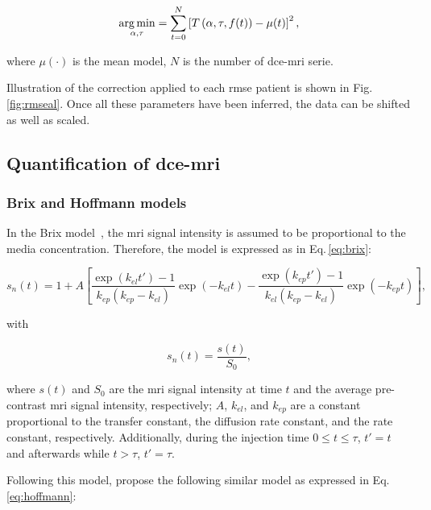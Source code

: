 \begin{equation}
  \operatorname*{arg\,min}_{\alpha, \tau} = \sum_{t=0}^{N} \left[ T\left(\alpha, \tau, f(t)\right) - \mu(t) \right]^{2} ,
  \label{eq:cost}
\end{equation}

\noindent where $\mu(\cdot)$ is the mean model, $N$ is the number of \ac{dce}-\ac{mri} serie.

Illustration of the correction applied to each \ac{rmse} patient is shown in Fig.\,\ref{fig:rmseal}.
Once all these parameters have been inferred, the data can be shifted as well as scaled.

\subsection{Quantification of \ac{dce}-\ac{mri}}\label{sec:stateart}

\subsubsection{Brix and Hoffmann models}\label{sec:brixhoffmann}

In the Brix model~\citep{brix1991pharmacokinetic}, the \ac{mri} signal intensity is assumed to be proportional to the media concentration.
Therefore, the model is expressed as in Eq.\,\eqref{eq:brix}:

\begin{equation}
  s_n(t) = 1 + A \left[ \frac{\exp(k_{el} t') - 1}{k_{ep}(k_{ep} - k_{el})} \exp(- k_{el} t) - \frac{\exp(k_{ep} t') - 1}{k_{el}(k_{ep} - k_{el})} \exp(- k_{ep} t) \right],
  \label{eq:brix}
\end{equation}

\noindent with

\begin{equation}
  s_n(t) = \frac{s(t)}{S_0},
  \label{eq:enh}
\end{equation}

\noindent where $s(t)$ and $S_0$ are the \ac{mri} signal intensity at time $t$ and the average pre-contrast \ac{mri} signal intensity, respectively; $A$, $k_{el}$, and $k_{ep}$ are a constant proportional to the transfer constant, the diffusion rate constant, and the rate constant, respectively. Additionally, during the injection time $0 \leq t \leq \tau$, $t' = t$ and afterwards while $t > \tau$, $t' = \tau$.

Following this model, \citeauthor{hoffmann1995pharmacokinetic} propose the following similar model as expressed in Eq.\,\eqref{eq:hoffmann}:

